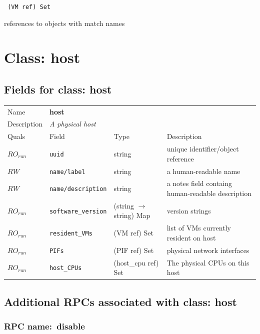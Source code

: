 \vspace{0.3cm}

{\tt 
(VM ref) Set
}


references to objects with match names
\vspace{0.3cm}
\vspace{0.3cm}
\vspace{0.3cm}

\vspace{1cm}
\newpage
\section{Class: host}
\subsection{Fields for class: host}
\begin{longtable}{|lllp{}|}
\hline
\multicolumn{1}{|l}{Name} & \multicolumn{3}{l|}{\bf host} \\
\multicolumn{1}{|l}{Description} & \multicolumn{3}{l|}{\parbox{11cm}{\em A physical host}} \\
\hline
Quals & Field & Type & Description \\
\hline
$\mathit{RO}_\mathit{run}$ &  {\tt uuid} & string & unique identifier/object reference \\
$\mathit{RW}$ &  {\tt name/label} & string & a human-readable name \\
$\mathit{RW}$ &  {\tt name/description} & string & a notes field containg human-readable description \\
$\mathit{RO}_\mathit{run}$ &  {\tt software\_version} & (string $\rightarrow$ string) Map & version strings \\
$\mathit{RO}_\mathit{run}$ &  {\tt resident\_VMs} & (VM ref) Set & list of VMs currently resident on host \\
$\mathit{RO}_\mathit{run}$ &  {\tt PIFs} & (PIF ref) Set & physical network interfaces \\
$\mathit{RO}_\mathit{run}$ &  {\tt host\_CPUs} & (host\_cpu ref) Set & The physical CPUs on this host \\
\hline
\end{longtable}
\subsection{Additional RPCs associated with class: host}
\subsubsection{RPC name:~disable}

